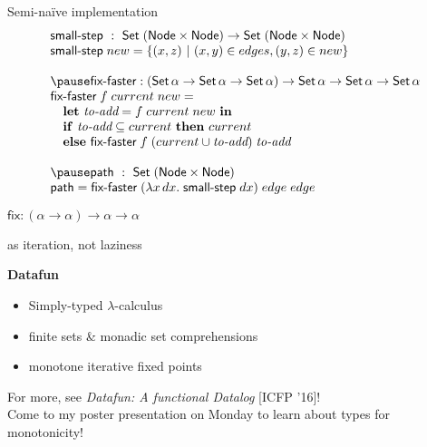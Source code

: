 \documentclass[dvipsnames]{beamer}
\newcommand\x\times
\newcommand{\ms}{\mathsf}
\newcommand{\setfor}[2]{\{#1 ~|~ #2\}}
\begin{document}

\begin{frame}{\Large Semi-na\"ive implementation}\large
  \[
  \begin{array}{l}
    \textsf{small-step} ~:~ \ms{Set}\;(\ms{Node} \x \ms{Node})
    \to \ms{Set}\;(\ms{Node} \x \ms{Node})\\
    \textsf{small-step} \; new =
    \setfor{(x,z)}{(x,y) \in edges, (y,z) \in new}\\
    \\
    \pause
    \textsf{fix-faster} : (\ms{Set}\,\alpha \to \ms{Set}\,\alpha \to \ms{Set} \,\alpha)
    \to \ms{Set}\,\alpha \to \ms{Set}\,\alpha \to \ms{Set}\,\alpha\\
    \textsf{fix-faster} \; f \; current \; new =\\
    \quad \mathbf{let}~\textit{to-add} = f \; current \; new ~\mathbf{in}\\
    \quad \mathbf{if}~ \textit{to-add} \subseteq current ~\mathbf{then}~ current\\
    \quad \mathbf{else}~ \textsf{fix-faster}\; f \; (current \cup \textit{to-add}) \; \textit{to-add}\\
    \\
    \pause
    \textsf{path} ~:~ \ms{Set}\; (\ms{Node} \x \ms{Node})\\
    \textsf{path} = \textsf{fix-faster}\; (\lambda x\, dx.\; \textsf{small-step}\; dx)
    \; edge \; edge
  \end{array}
  \]
\end{frame}


\begin{frame}
  \Huge\centering
  $\ms{fix} : (\alpha \to \alpha) \to \alpha \to \alpha$

  \vspace{0.66em}
  \huge
  as iteration, not laziness
\end{frame}

\begin{frame}
  \Huge 
  \begin{center} \textbf{Datafun} \end{center}

  \LARGE
  \begin{itemize}
  \item Simply-typed $\lambda$-calculus
  \item finite sets \& monadic set comprehensions
  \item monotone\textsuperscript{\textdagger} iterative fixed points
  \end{itemize}
  \vspace{0.5cm}

  \normalsize For more, see \emph{Datafun: A functional Datalog} [ICFP '16]!
  \\[1em]
  \textsuperscript{\textdagger}Come to my poster presentation on Monday to learn about types for monotonicity!
\end{frame}
\end{document}
